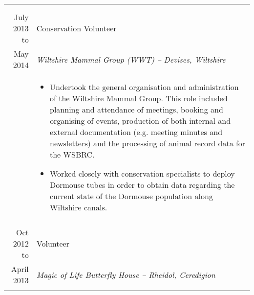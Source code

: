 \documentclass[a4paper, 10pt]{extarticle} %
\begin{document}
\begin{longtable}{r | p{13cm}}
{\begin{itemize}[leftmargin=*]
\end{itemize} } \\

\multicolumn{2}{c}{} \\

			July 2013 to
		
		 & 
		 
		 Conservation Volunteer  \\
		 
			May 2014
		 
		& 
		 
		\textit{Wiltshire Mammal Group (WWT) – Devises, Wiltshire} \\ 
		
& 

\footnotesize{

\vspace{-0.3cm}

\begin{itemize}[leftmargin=*]

\item Undertook the general organisation and administration of the Wiltshire Mammal Group. This role included planning and attendance of meetings, booking and organising of events, production of both internal and external documentation (e.g. meeting minutes and newsletters) and the processing of animal record data for the WSBRC. 

\item Worked closely with conservation specialists to deploy Dormouse tubes in order to obtain data regarding the current state of the Dormouse population along Wiltshire canals.

\vspace{-0.3cm}

\end{itemize}

} \\

\multicolumn{2}{c}{} \\

			Oct 2012 to
		
		 & 
		 
		  Volunteer  \\
		 
			April 2013
		 
		& 
		 
		\textit{Magic of Life Butterfly House – Rheidol, Ceredigion} \\ 
		
& 

\footnotesize{

}
\end{longtable}
\end{document}
